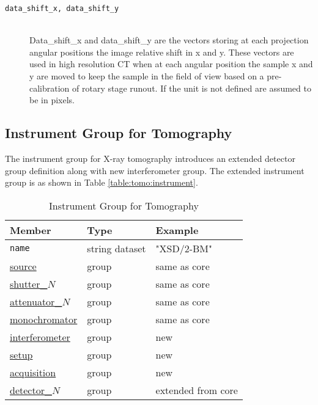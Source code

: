 \begin{description}
\item[ \tt{data\_shift\_x, data\_shift\_y}] \hfill \\
{Data\_shift\_x and data\_shift\_y are the vectors storing at each projection angular positions the image relative shift in x and y.  These vectors are used in high resolution CT when at each angular position the sample x and y are moved to keep the sample in the field of view based on a pre-calibration of rotary stage runout. If the unit is not defined are assumed to be in pixels.}

\end{description}

\subsection{Instrument Group for Tomography}
\label{tomo:instrument}
The instrument group for X-ray tomography introduces an extended detector group definition along with new interferometer group. The extended instrument group is as shown in Table \ref{table:tomo:instrument}.

\label{table:tomo:instrument}
\begin{table}[h!]\sffamily \footnotesize
\centering
\caption{Instrument Group for Tomography}
\begin{tabular}{l l l}
\toprule
\bfseries Member     & \bfseries Type & \bfseries Example \\
\midrule
\tt{name} & string dataset & "XSD/2-BM" \\
\hyperref[table:source]{source} &  group & same as core\\
\hyperref[table:shutter]{shutter\_$N$}  &  group &  same as core\\
\hyperref[table:attenuator]{attenuator\_$N$} & group & same as core\\
\hyperref[table:monochromator]{monochromator} & group & same as core\\
\hyperref[table:tomo:interferometer]{interferometer} & group & new \\
\hyperref[table:tomo:setup]{setup} & group & new \\
\hyperref[table:tomo:acquisition]{acquisition} & group & new \\
\hyperref[table:tomo:detector]{detector\_$N$} & group & extended from core\\
\bottomrule
\end{tabular}
\end{table}


